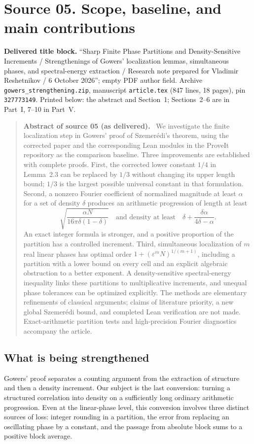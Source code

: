 \documentclass[11pt,letterpaper]{article}
\numberwithin{equation}{section}
\theoremstyle{definition}
\theoremstyle{remark}
\newcommand{\1}{\mathbf 1}
\newcommand{\eps}{\varepsilon}
\newcommand{\file}[1]{\nolinkurl{#1}}
\newcommand{\srcnote}[2]{\par\noindent{\small\textit{Source #1, delivered #2.}}\par}
\newenvironment{partabstract}[1]{\begin{quote}\small\noindent\textbf{Abstract of source #1 (as delivered).}\ }{\end{quote}}
\newcommand{\partsource}[1]{\par\noindent\begin{minipage}{\textwidth}\small #1\end{minipage}\par\medskip}
\begin{document}
\section[{Source 05: Scope, baseline, and main contributions}]{Source 05. Scope, baseline, and main contributions}\label{gsr:fm:05:sec:d1}
\srcnote{05}{Section 1}
\partsource{\textbf{Delivered title block.} ``Sharp Finite Phase Partitions and Density-Sensitive Increments / Strengthenings of Gowers' localization lemmas, simultaneous phases, and spectral-energy extraction / Research note prepared for Vladimir Reshetnikov / 6 October 2026''; empty PDF author field. Archive \file{gowers\_strengthening.zip}, manuscript \file{article.tex} (847 lines, 18 pages), pin \texttt{327773149}. Printed below: the abstract and Section~1; Sections~2--6 are in Part~I, 7--10 in Part~V.}
\begin{partabstract}{05}
We investigate the finite localization step in Gowers' proof of Szemer\'edi's theorem, using the corrected paper and the corresponding Lean modules in the ProveIt repository as the comparison baseline. Three improvements are established with complete proofs. First, the corrected lower constant $1/4$ in Lemma~2.3 can be replaced by $1/3$ without changing its upper length bound; $1/3$ is the largest possible universal constant in that formulation. Second, a nonzero Fourier coefficient of normalized magnitude at least $\alpha$ for a set of density $\delta$ produces an arithmetic progression of length at least
\[
 \sqrt{\frac{\alpha N}{16\pi\delta(1-\delta)}}
 \quad\text{and density at least}\quad
 \delta+\frac{\delta\alpha}{4\delta-\alpha}.
\]
An exact integer formula is stronger, and a positive proportion of the partition has a controlled increment. Third, simultaneous localization of $m$ real linear phases has optimal order $1+(\eps^mN)^{1/(m+1)}$, including a partition with a lower bound on every cell and an explicit algebraic obstruction to a better exponent. A density-sensitive spectral-energy inequality links these partitions to multiplicative increments, and unequal phase tolerances can be optimized explicitly. The methods are elementary refinements of classical arguments; claims of literature priority, a new global Szemer\'edi bound, and completed Lean verification are not made. Exact-arithmetic partition tests and high-precision Fourier diagnostics accompany the article.
\end{partabstract}
\label{gsr:fm:05:sec:scope}

\subsection{What is being strengthened}
Gowers' proof \cite{gowers} separates a counting argument from the extraction of structure and then a density increment. Our subject is the last conversion: turning a structured correlation into density on a sufficiently long ordinary arithmetic progression. Even at the linear-phase level, this conversion involves three distinct sources of loss: integer rounding in a partition, the error from replacing an oscillating phase by a constant, and the passage from absolute block sums to a positive block average.
\end{document}
